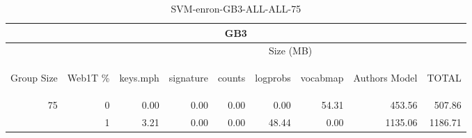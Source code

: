 \begin{center}
\begin{table}[htbp] 
 \begin{center}
\begin{tabular}{ | r | r | r | r | r | r | r | r | r |}
\hline
\multicolumn{9}{|c|}{GB3}\\
\hline
 & & \multicolumn{7}{|c|}{Size (MB)}\\ \cline{3-9}
\begin{sideways}Group Size\end{sideways} & \begin{sideways}Web1T \% \end{sideways} & \begin{sideways}keys.mph\end{sideways} & \begin{sideways}signature\end{sideways} & \begin{sideways}counts\end{sideways} & \begin{sideways}logprobs\end{sideways} & \begin{sideways}vocabmap\end{sideways} & \begin{sideways}Authors Model \end{sideways} & \begin{sideways}TOTAL\end{sideways}\\
\hline
\multirow{1}{*}{75}
 & 0 & 0.00 & 0.00 & 0.00 & 0.00 & 54.31 & 453.56 & 507.86\\ \cline{2-9}
 & 1 & 3.21 & 0.00 & 0.00 & 48.44 & 0.00 & 1135.06 & 1186.71\\ \cline{2-9}
\hline
\end{tabular}
\caption{SVM-enron-GB3-ALL-ALL-75}
\label{table:SVM-enron-GB3-ALL-ALL-75}
\end{center}
 \end{table}
\end{center}

